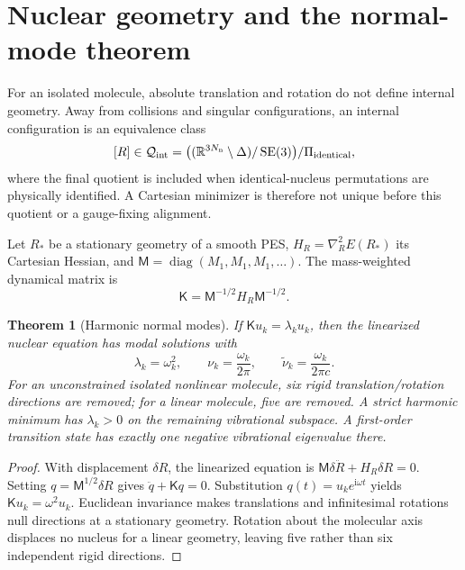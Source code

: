 \documentclass[11pt,a4paper]{article}
\theoremstyle{definition}
\theoremstyle{plain}
\newtheorem{theorem}[definition]{Theorem}
\theoremstyle{remark}
\newcommand{\R}{\mathbb{R}}
\newcommand{\Qcal}{\mathcal Q}
\newcommand{\I}{\mathrm i}
\newcommand{\diag}{\operatorname{diag}}
\newcommand{\SE}{\operatorname{SE}}
\begin{document}
\section{Nuclear geometry and the normal-mode theorem}

For an isolated molecule, absolute translation and rotation do not
define internal geometry.  Away from collisions and singular
configurations, an internal configuration is an equivalence class
\[
[R]\in
\Qcal_{\rm int}
=\bigl((\R^{3N_{\rm n}}\setminus\Delta)/\SE(3)\bigr)/
\Pi_{\rm identical},
\]
where the final quotient is included when identical-nucleus
permutations are physically identified.  A Cartesian minimizer is
therefore not unique before this quotient or a gauge-fixing
alignment.

Let \(R_\ast\) be a stationary geometry of a smooth PES,
\(H_R=\nabla_R^2E(R_\ast)\) its Cartesian Hessian, and
\(\mathsf M=\diag(M_1,M_1,M_1,\ldots)\).  The mass-weighted dynamical
matrix is
\begin{equation}\label{eq:mass-weighted-hessian}
\mathsf K
=\mathsf M^{-1/2}H_R\mathsf M^{-1/2}.
\end{equation}

\begin{theorem}[Harmonic normal modes]
\label{thm:normal-modes}
If \(\mathsf K u_k=\lambda_k u_k\), then the linearized nuclear
equation has modal solutions with
\begin{equation}\label{eq:frequency-square}
\lambda_k=\omega_k^2,
\qquad
\nu_k=\frac{\omega_k}{2\pi},
\qquad
\widetilde\nu_k=\frac{\omega_k}{2\pi c}.
\end{equation}
For an unconstrained isolated nonlinear molecule, six rigid
translation/rotation directions are removed; for a linear molecule,
five are removed.  A strict harmonic minimum has
\(\lambda_k>0\) on the remaining vibrational subspace.  A first-order
transition state has exactly one negative vibrational eigenvalue
there.
\end{theorem}

\begin{proof}
With displacement \(\delta R\), the linearized equation is
\(\mathsf M\delta\ddot R+H_R\delta R=0\).  Setting
\(q=\mathsf M^{1/2}\delta R\) gives
\(\ddot q+\mathsf Kq=0\).  Substitution
\(q(t)=u_ke^{\I\omega t}\) yields
\(\mathsf Ku_k=\omega^2u_k\).  Euclidean invariance makes
translations and infinitesimal rotations null directions at a
stationary geometry.  Rotation about the molecular axis displaces no
nucleus for a linear geometry, leaving five rather than six
independent rigid directions.
\end{proof}
\end{document}
